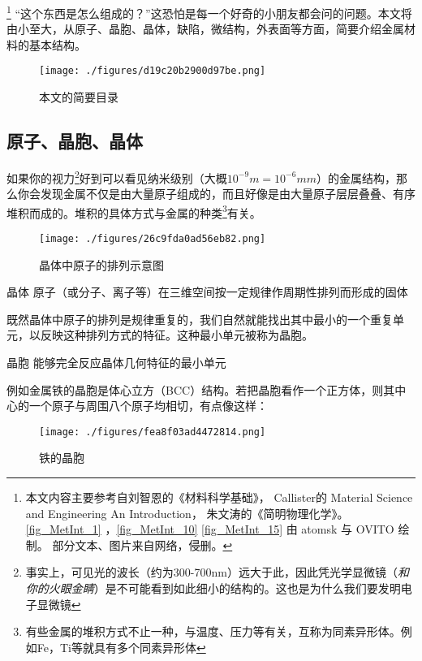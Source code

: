 
\footnote{本文内容主要参考自刘智恩的《材料科学基础》，
Callister的 Material Science and Engineering An Introduction，
朱文涛的《简明物理化学》。 
\autoref{fig_MetInt_1} ，\autoref{fig_MetInt_10} \autoref{fig_MetInt_15} 由 atomsk 与 OVITO 绘制。 部分文本、图片来自网络，侵删。} “这个东西是怎么组成的？”这恐怕是每一个好奇的小朋友都会问的问题。本文将由小至大，从原子、晶胞、晶体，缺陷，微结构，外表面等方面，简要介绍金属材料的基本结构。
\begin{figure}[ht]
\centering
\texttt{[image: ./figures/d19c20b2900d97be.png]}
\caption{本文的简要目录} \label{fig_MetInt_18}
\end{figure}

\subsection{原子、晶胞、晶体}
如果你的视力\footnote{事实上，可见光的波长（约为300-700nm）远大于此，因此凭光学显微镜（\textsl{和你的火眼金睛}）是不可能看到如此细小的结构的。这也是为什么我们要发明电子显微镜}好到可以看见纳米级别（大概$10^{-9}m =10^{-6} mm$）的金属结构，那么你会发现金属不仅是由大量原子组成的，而且好像是由大量原子层层叠叠、有序堆积而成的。堆积的具体方式与金属的种类\footnote{有些金属的堆积方式不止一种，与温度、压力等有关，互称为同素异形体。例如Fe，Ti等就具有多个同素异形体}有关。

\begin{figure}[ht]
\centering
\texttt{[image: ./figures/26c9fda0ad56eb82.png]}
\caption{晶体中原子的排列示意图} \label{fig_MetInt_1}
\end{figure}

\begin{definition}{晶体}
原子（或分子、离子等）在三维空间按一定规律作周期性排列而形成的固体
\end{definition}

既然晶体中原子的排列是规律重复的，我们自然就能找出其中最小的一个重复单元，以反映这种排列方式的特征。这种最小单元被称为晶胞。
\begin{definition}{晶胞}
能够完全反应晶体几何特征的最小单元
\end{definition}
例如金属铁的晶胞是体心立方（BCC）结构。若把晶胞看作一个正方体，则其中心的一个原子与周围八个原子均相切，有点像这样：
\begin{figure}[ht]
\centering
\texttt{[image: ./figures/fea8f03ad4472814.png]}
\caption{铁的晶胞} \label{fig_MetInt_2}
\end{figure}

